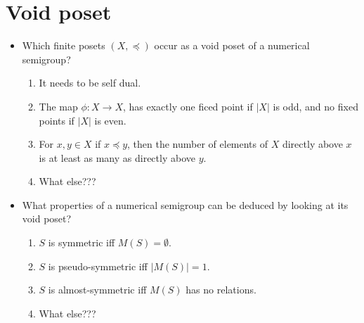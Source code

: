 \documentclass{article}
\theoremstyle{definition}
\theoremstyle{definition}
\theoremstyle{definition}
\begin{document}
\section{Void poset}
\begin{itemize}
    \item Which finite posets $(X,\preccurlyeq)$ occur as a void poset of a numerical semigroup?
    \begin{enumerate}
        \item It needs to be self dual.
        \item The map $\phi: X\to X$, has exactly one ficed point if $|X|$ is odd, and no fixed points if $|X|$ is even.
        \item For $x,y\in X$ if $x\preccurlyeq y$, then the number of elements of $X$ directly above $x$ is at least as many as directly above $y$.
        \item What else???
    \end{enumerate}
    \item What properties of a numerical semigroup can be deduced by looking at its void poset?
    \begin{enumerate}
        \item $S$ is symmetric iff $M(S)=\emptyset$.
        \item $S$ is pseudo-symmetric iff $|M(S)|=1$.
        \item $S$ is almost-symmetric iff $M(S)$ has no relations.
        \item What else???
    \end{enumerate}
\end{itemize}
\end{document}
